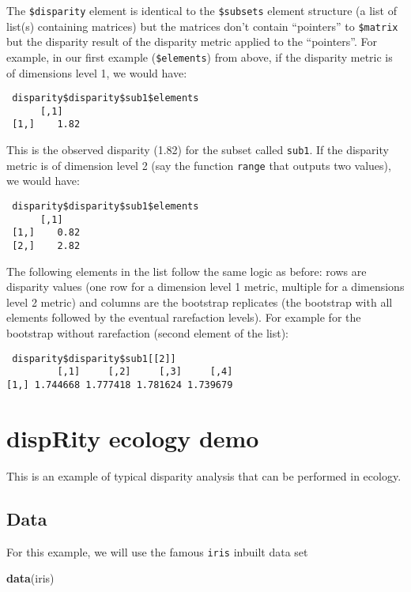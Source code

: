 \documentclass[
]{book}
\newenvironment{Shaded}{\begin{snugshade}}{\end{snugshade}}
\newcommand{\KeywordTok}[1]{\textcolor[rgb]{0.13,0.29,0.53}{\textbf{#1}}}
\newcommand{\NormalTok}[1]{#1}
\begin{document}
The \texttt{\$disparity} element is identical to the \texttt{\$subsets} element structure (a list of list(s) containing matrices) but the matrices don't contain ``pointers'' to \texttt{\$matrix} but the disparity result of the disparity metric applied to the ``pointers''.
For example, in our first example (\texttt{\$elements}) from above, if the disparity metric is of dimensions level 1, we would have:

\begin{verbatim}
 disparity$disparity$sub1$elements
      [,1]
 [1,]    1.82
\end{verbatim}

This is the observed disparity (1.82) for the subset called \texttt{sub1}.
If the disparity metric is of dimension level 2 (say the function \texttt{range} that outputs two values), we would have:

\begin{verbatim}
 disparity$disparity$sub1$elements
      [,1]
 [1,]    0.82
 [2,]    2.82
\end{verbatim}

The following elements in the list follow the same logic as before: rows are disparity values (one row for a dimension level 1 metric, multiple for a dimensions level 2 metric) and columns are the bootstrap replicates (the bootstrap with all elements followed by the eventual rarefaction levels).
For example for the bootstrap without rarefaction (second element of the list):

\begin{verbatim}
 disparity$disparity$sub1[[2]]
         [,1]     [,2]     [,3]     [,4]
[1,] 1.744668 1.777418 1.781624 1.739679 
\end{verbatim}

\hypertarget{disprity-ecology-demo}{%
\chapter{dispRity ecology demo}\label{disprity-ecology-demo}}

This is an example of typical disparity analysis that can be performed in ecology.

\hypertarget{data}{%
\section{Data}\label{data}}

For this example, we will use the famous \texttt{iris} inbuilt data set

\begin{Shaded}
\begin{Highlighting}[]
\KeywordTok{data}\NormalTok{(iris)}
\end{Highlighting}
\end{Shaded}
\end{document}

